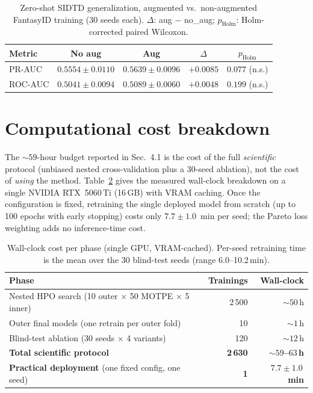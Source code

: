 \documentclass[11pt]{article}
\newcommand{\revB}[1]{#1}
\begin{document}
\begin{table}[h]
  \centering
  \caption{Zero-shot SIDTD generalization, augmented vs.\ non-augmented
           FantasyID training (30 seeds each). $\Delta$: aug $-$ no\_aug;
           $p_{\text{Holm}}$: Holm-corrected paired Wilcoxon.}
  \label{tab:aug_sidtd}
  \begin{tabular}{lcccc}
    \toprule
    Metric & No aug & Aug & $\Delta$ & $p_{\text{Holm}}$ \\
    \midrule
    PR-AUC  & $0.5554\pm0.0110$ & $0.5639\pm0.0096$ & $+0.0085$ & $0.077$ (n.s.) \\
    ROC-AUC & $0.5041\pm0.0094$ & $0.5089\pm0.0060$ & $+0.0048$ & $0.199$ (n.s.) \\
    \bottomrule
  \end{tabular}
\end{table}

\section{\revB{Computational cost breakdown}}
\label{sec:compute}

\revB{The ${\sim}59$-hour budget reported in Sec.~4.1 is the cost of the full
\emph{scientific} protocol (unbiased nested cross-validation plus a 30-seed
ablation), not the cost of \emph{using} the method. Table~\ref{tab:compute}
gives the measured wall-clock breakdown on a single NVIDIA RTX~5060\,Ti
(16\,GB) with VRAM caching. Once the configuration is fixed, retraining the
single deployed model from scratch (up to 100 epochs with early stopping)
costs only $7.7\pm1.0$~min per seed; the Pareto loss weighting adds no
inference-time cost.}

\begin{table}[h]
  \centering
  \caption{\revB{Wall-clock cost per phase (single GPU, VRAM-cached). Per-seed
           retraining time is the mean over the 30 blind-test seeds
           (range 6.0--10.2\,min).}}
  \label{tab:compute}
  \begin{tabular}{lrr}
    \toprule
    Phase & Trainings & Wall-clock \\
    \midrule
    Nested HPO search (10 outer $\times$ 50 MOTPE $\times$ 5 inner) & 2\,500 & ${\sim}50$\,h \\
    Outer final models (one retrain per outer fold)                & 10     & ${\sim}1$\,h  \\
    Blind-test ablation (30 seeds $\times$ 4 variants)             & 120    & ${\sim}12$\,h \\
    \midrule
    \textbf{Total scientific protocol}                             & \textbf{2\,630} & \textbf{${\sim}59$--$63$\,h} \\
    \midrule
    \textbf{Practical deployment} (one fixed config, one seed)     & \textbf{1} & \textbf{$7.7\pm1.0$\,min} \\
    \bottomrule
  \end{tabular}
\end{table}
\end{document}
